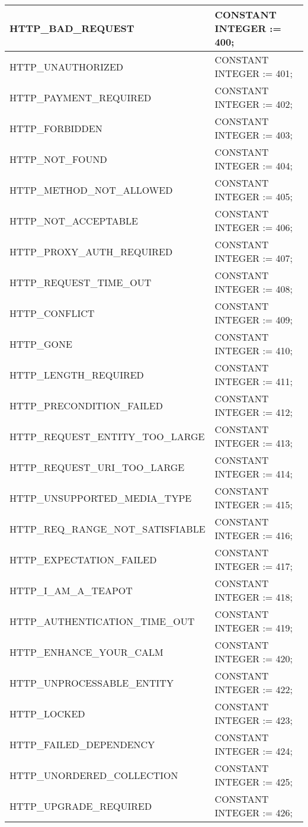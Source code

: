 \documentclass[letterpaper,10pt,english,openany,oneside]{sphinxmanual}
\begin{document}
\begin{savenotes}
\begin{longtable}{|l|l|}
HTTP\_BAD\_REQUEST
&
CONSTANT INTEGER := 400;
\\
\hline
HTTP\_UNAUTHORIZED
&
CONSTANT INTEGER := 401;
\\
\hline
HTTP\_PAYMENT\_REQUIRED
&
CONSTANT INTEGER := 402;
\\
\hline
HTTP\_FORBIDDEN
&
CONSTANT INTEGER := 403;
\\
\hline
HTTP\_NOT\_FOUND
&
CONSTANT INTEGER := 404;
\\
\hline
HTTP\_METHOD\_NOT\_ALLOWED
&
CONSTANT INTEGER := 405;
\\
\hline
HTTP\_NOT\_ACCEPTABLE
&
CONSTANT INTEGER := 406;
\\
\hline
HTTP\_PROXY\_AUTH\_REQUIRED
&
CONSTANT INTEGER := 407;
\\
\hline
HTTP\_REQUEST\_TIME\_OUT
&
CONSTANT INTEGER := 408;
\\
\hline
HTTP\_CONFLICT
&
CONSTANT INTEGER := 409;
\\
\hline
HTTP\_GONE
&
CONSTANT INTEGER := 410;
\\
\hline
HTTP\_LENGTH\_REQUIRED
&
CONSTANT INTEGER := 411;
\\
\hline
HTTP\_PRECONDITION\_FAILED
&
CONSTANT INTEGER := 412;
\\
\hline
HTTP\_REQUEST\_ENTITY\_TOO\_LARGE
&
CONSTANT INTEGER := 413;
\\
\hline
HTTP\_REQUEST\_URI\_TOO\_LARGE
&
CONSTANT INTEGER := 414;
\\
\hline
HTTP\_UNSUPPORTED\_MEDIA\_TYPE
&
CONSTANT INTEGER := 415;
\\
\hline
HTTP\_REQ\_RANGE\_NOT\_SATISFIABLE
&
CONSTANT INTEGER := 416;
\\
\hline
HTTP\_EXPECTATION\_FAILED
&
CONSTANT INTEGER := 417;
\\
\hline
HTTP\_I\_AM\_A\_TEAPOT
&
CONSTANT INTEGER := 418;
\\
\hline
HTTP\_AUTHENTICATION\_TIME\_OUT
&
CONSTANT INTEGER := 419;
\\
\hline
HTTP\_ENHANCE\_YOUR\_CALM
&
CONSTANT INTEGER := 420;
\\
\hline
HTTP\_UNPROCESSABLE\_ENTITY
&
CONSTANT INTEGER := 422;
\\
\hline
HTTP\_LOCKED
&
CONSTANT INTEGER := 423;
\\
\hline
HTTP\_FAILED\_DEPENDENCY
&
CONSTANT INTEGER := 424;
\\
\hline
HTTP\_UNORDERED\_COLLECTION
&
CONSTANT INTEGER := 425;
\\
\hline
HTTP\_UPGRADE\_REQUIRED
&
CONSTANT INTEGER := 426;
\\

\end{longtable}
\end{savenotes}
\end{document}
